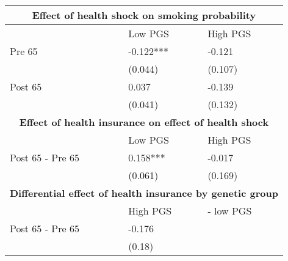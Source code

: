 % 
\begin{tabular}{lll}
  \toprule
  \multicolumn{3}{c}{ \textbf{Effect of health shock on smoking probability}} \\
 \midrule
 & Low PGS & High PGS \\ 
   \midrule
Pre 65 & -0.122*** & -0.121 \\ 
   & (0.044) & (0.107) \\ 
  Post 65 & 0.037 & -0.139 \\ 
   & (0.041) & (0.132) \\ 
   \toprule \multicolumn{3}{c}{ \textbf{Effect of health insurance on effect of health shock}} \\
 \midrule
 & Low PGS & High PGS \\ 
   \midrule
Post 65 - Pre 65 & 0.158*** & -0.017 \\ 
   & (0.061) & (0.169) \\ 
   \toprule \multicolumn{3}{c}{ \textbf{Differential effect of health insurance by genetic group}} \\
 \midrule
 & High PGS  & - low PGS \\ 
   \midrule
Post 65 - Pre 65 & -0.176 &  \\ 
   & (0.18) &  \\ 
   \bottomrule
\end{tabular}
